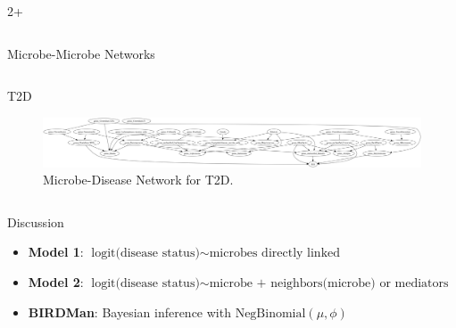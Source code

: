 \documentclass[final]{beamer}
\newlength{\sepwidth}
\newlength{\colwidth}
\begin{document}
\begin{frame}[t]
\begin{columns}[t]
\begin{column}{2\colwidth + \sepwidth}
\begin{columns}[t]
\begin{column}{\colwidth}
\begin{block}{Microbe-Microbe Networks}
      \end{block}
      \end{column}
  \end{columns}
  
  \begin{block}{T2D}


    \begin{figure}
      \centering
      \includegraphics[width=\linewidth]{../graphs/t2d/cdnod_norm.png}
      \caption{Microbe-Disease Network for T2D.}
    \end{figure}
  


    
  \end{block}

  \begin{columns}[t]
    \begin{column}{\colwidth}
      \begin{block}{Discussion}
      \begin{itemize}
        \item \textbf{Model 1}: \( \text{logit(disease status)} \sim \text{microbes directly linked} \)
        \item \textbf{Model 2}: \( \text{logit(disease status)} \sim \text{microbe + neighbors(microbe) or mediators} \)
        \item \textbf{BIRDMan}: Bayesian inference with \( \text{NegBinomial}(\mu, \phi) \)
      \end{itemize}


\end{block}
\end{column}
\end{columns}
\end{column}
\end{columns}
\end{frame}
\end{document}
